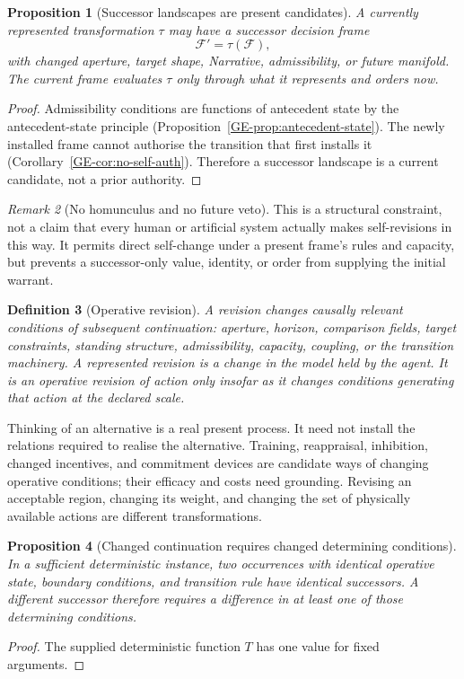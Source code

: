 \documentclass[11pt,a4paper]{article}
\newtheorem{definition}{Definition}[section]
\newtheorem{proposition}[definition]{Proposition}
\theoremstyle{remark}
\newtheorem{remark}[definition]{Remark}
\newcommand{\Frame}{\mathcal F}
\begin{document}
\begin{proposition}[Successor landscapes are present candidates]\label{prop:self}
A currently represented transformation \(\tau\) may have a successor decision
frame
\[
\Frame' = \tau(\Frame),
\]
with changed aperture, target shape, Narrative, admissibility, or future
manifold. The current frame evaluates \(\tau\) only through what it represents
and orders now.
\end{proposition}

\begin{proof}
Admissibility conditions are functions of antecedent state by the
antecedent-state principle (Proposition~\ref{GE-prop:antecedent-state}). The
newly installed frame cannot authorise the transition that first installs it
(Corollary~\ref{GE-cor:no-self-auth}). Therefore a successor landscape is a
current candidate, not a prior authority.
\end{proof}

\begin{remark}[No homunculus and no future veto]\label{rem:self}
This is a structural constraint, not a claim that every human or artificial
system actually makes self-revisions in this way. It permits direct self-change
under a present frame's rules and capacity, but prevents a successor-only value,
identity, or order from supplying the initial warrant.
\end{remark}

\begin{definition}[Operative revision]\label{def:revision}
A revision changes causally relevant conditions of subsequent continuation:
aperture, horizon, comparison fields, target constraints, standing structure,
admissibility, capacity, coupling, or the transition machinery. A represented
revision is a change in the model held by the agent. It is an operative
revision of action only insofar as it changes conditions generating that
action at the declared scale.
\end{definition}

Thinking of an alternative is a real present process. It need not install
the relations required to realise the alternative. Training, reappraisal,
inhibition, changed incentives, and commitment devices are candidate ways
of changing operative conditions; their efficacy and costs need grounding.
Revising an acceptable region, changing its weight, and changing the set of
physically available actions are different transformations.

\begin{proposition}[Changed continuation requires changed determining conditions]\label{prop:revision-conditions}
In a sufficient deterministic instance, two occurrences with identical
operative state, boundary conditions, and transition rule have identical
successors. A different successor therefore requires a difference in at
least one of those determining conditions.
\end{proposition}
\begin{proof}
The supplied deterministic function \(T\) has one value for fixed arguments.
\end{proof}
\end{document}
